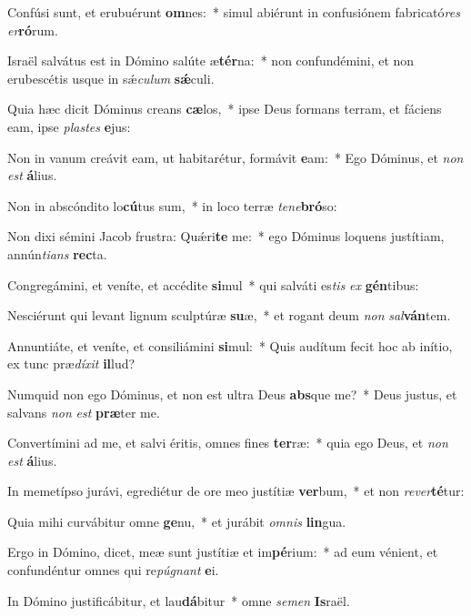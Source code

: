 \item Confúsi sunt, et erubuérunt \textbf{om}nes:~* simul abiérunt in confusiónem fabricató\textit{res} \textit{er}\textbf{ró}rum.
\item Israël salvátus est in Dómino salúte æ\textbf{tér}na:~* non confundémini, et non erubescétis usque in sǽ\textit{cu}\textit{lum} \textbf{sǽ}culi.
\item Quia hæc dicit Dóminus creans \textbf{cæ}los,~* ipse Deus formans terram, et fáciens eam, ipse \textit{plas}\textit{tes} \textbf{e}jus:
\item Non in vanum creávit eam, ut habitarétur, formávit \textbf{e}am:~* Ego Dóminus, et \textit{non} \textit{est} \textbf{á}lius.
\item Non in abscóndito lo\textbf{cú}tus sum,~* in loco terræ \textit{te}\textit{ne}\textbf{bró}so:
\item Non dixi sémini Jacob frustra: Quǽri\textbf{te} me:~* ego Dóminus loquens justítiam, annún\textit{ti}\textit{ans} \textbf{rec}ta.
\item Congregámini, et veníte, et accédite \textbf{si}mul~* qui salváti es\textit{tis} \textit{ex} \textbf{gén}tibus:
\item Nesciérunt qui levant lignum sculptúræ \textbf{su}æ,~* et rogant deum \textit{non} \textit{sal}\textbf{ván}tem.
\item Annuntiáte, et veníte, et consiliámini \textbf{si}mul:~* Quis audítum fecit hoc ab inítio, ex tunc præ\textit{dí}\textit{xit} \textbf{il}lud?
\item Numquid non ego Dóminus, et non est ultra Deus \textbf{abs}que me?~* Deus justus, et salvans \textit{non} \textit{est} \textbf{præ}ter me.
\item Convertímini ad me, et salvi éritis, omnes fines \textbf{ter}ræ:~* quia ego Deus, et \textit{non} \textit{est} \textbf{á}lius.
\item In memetípso jurávi, egrediétur de ore meo justítiæ \textbf{ver}bum,~* et non \textit{re}\textit{ver}\textbf{té}tur:
\item Quia mihi curvábitur omne \textbf{ge}nu,~* et jurábit \textit{om}\textit{nis} \textbf{lin}gua.
\item Ergo in Dómino, dicet, meæ sunt justítiæ et im\textbf{pé}rium:~* ad eum vénient, et confundéntur omnes qui re\textit{pú}\textit{gnant} \textbf{e}i.
\item In Dómino justificábitur, et lau\textbf{dá}bitur~* omne \textit{se}\textit{men} \textbf{Is}raël.
